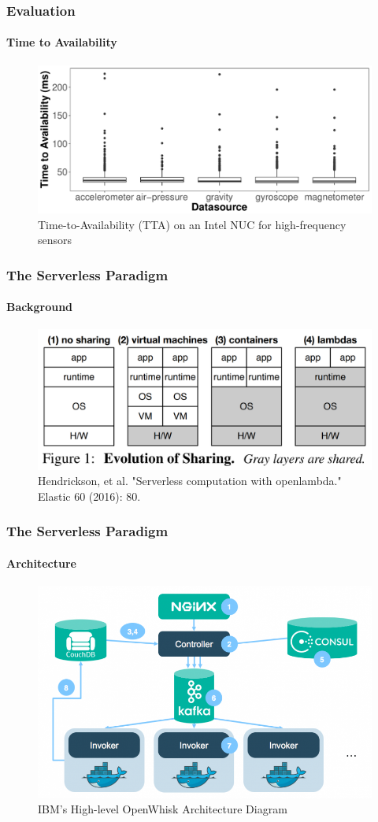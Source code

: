 \documentclass[aspectratio=169]{beamer}
\begin{document}
\begin{frame}
	\frametitle{Evaluation}
	\framesubtitle{Time to Availability}

	\begin{figure}
		\centering
		\includegraphics[width=0.8\linewidth]{source-tta.pdf}
		\caption{Time-to-Availability (TTA) on an Intel NUC for high-frequency sensors}
	\end{figure}
\end{frame}

\begin{frame}
	\frametitle{The Serverless Paradigm}
	\framesubtitle{Background}

	\begin{figure}
		\centering
		\includegraphics[width=\linewidth]{openlambda}
		\caption{Hendrickson, et al. "Serverless computation with openlambda." Elastic 60 (2016): 80.}
	\end{figure}
\end{frame}

\begin{frame}
	\frametitle{The Serverless Paradigm}
	\framesubtitle{Architecture}

	\begin{figure}
		\centering
		\includegraphics[width=0.6\linewidth]{openwhisk-arch}
		\caption{IBM's High-level OpenWhisk Architecture Diagram}
	\end{figure}
\end{frame}
\end{document}
